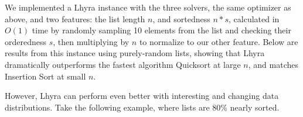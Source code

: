 \documentclass{article}
\begin{document}
We implemented a Lhyra instance with the three solvers, the same optimizer as above, and two features: the list length $n$, and sortedness $n*s$, calculated in $O(1)$ time by randomly sampling 10 elements from the list and checking their orderedness $s$, then multiplying by $n$ to normalize to our other feature.  Below are results from this instance using purely-random lists, showing that Lhyra dramatically outperforms the fastest algorithm Quicksort at large $n$, and matches Insertion Sort at small $n$.

\begin{figure}[!ht]
    \centering
    \begin{floatrow}
      
    \end{floatrow}
\end{figure}

However, Lhyra can perform even better with interesting and changing data distributions.  Take the following example, where lists are 80\% nearly sorted.
\end{document}
